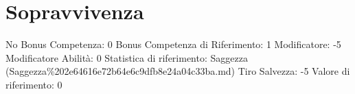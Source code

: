 \section{Sopravvivenza}\label{sopravvivenza}

\begin{description}
\tightlist
\item[Tags: ABI]
No Bonus Competenza: 0 Bonus Competenza di Riferimento: 1 Modificatore:
-5 Modificatore Abilità: 0 Statistica di riferimento: Saggezza
(Saggezza\%202e64616e72b64e6c9dfb8e24a04c33ba.md) Tiro Salvezza: -5
Valore di riferimento: 0
\end{description}
